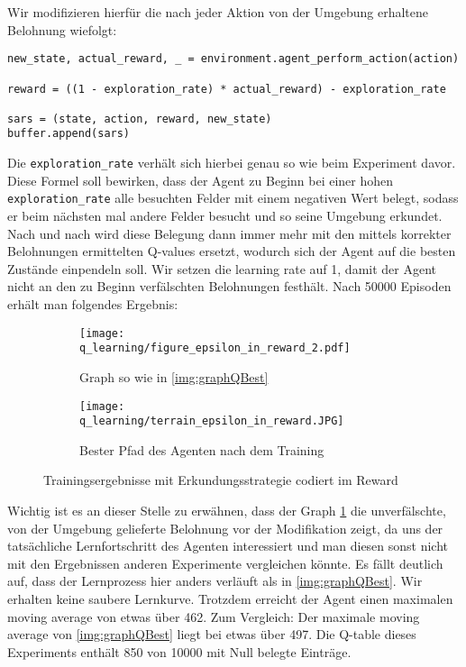 Wir modifizieren hierfür die nach jeder Aktion von der Umgebung erhaltene Belohnung wiefolgt:
\begin{verbatim}
new_state, actual_reward, _ = environment.agent_perform_action(action)

reward = ((1 - exploration_rate) * actual_reward) - exploration_rate

sars = (state, action, reward, new_state)
buffer.append(sars)
\end{verbatim}
Die \texttt{exploration_rate} verhält sich hierbei genau so wie beim Experiment davor. Diese Formel soll bewirken, dass der Agent zu Beginn bei einer hohen \texttt{exploration_rate} alle besuchten Felder mit einem negativen Wert belegt, sodass er beim nächsten mal andere Felder besucht und so seine Umgebung erkundet. Nach und nach wird diese Belegung dann immer mehr mit den mittels korrekter Belohnungen ermittelten Q-values ersetzt, wodurch sich der Agent auf die besten Zustände einpendeln soll. Wir setzen die learning rate auf 1, damit der Agent nicht an den zu Beginn verfälschten Belohnungen festhält. Nach 50000 Episoden erhält man folgendes Ergebnis:
\begin{figure}[H]
    \centering
    \begin{subfigure}[b]{0.49\textwidth}
        \texttt{[image: q\_learning/figure\_epsilon\_in\_reward\_2.pdf]}
        \caption{Graph so wie in \ref{img:graphQBest}}
        \label{img:graphQEpsInRew}
    \end{subfigure}
    \begin{subfigure}[b]{0.49\textwidth}
        \texttt{[image: q\_learning/terrain\_epsilon\_in\_reward.JPG]}
        \caption{Bester Pfad des Agenten nach dem Training}
        \label{img:pathQEpsInRew}
    \end{subfigure}
    \caption{Trainingsergebnisse mit Erkundungsstrategie codiert im Reward}
\end{figure}
Wichtig ist es an dieser Stelle zu erwähnen, dass der Graph \ref{img:graphQEpsInRew} die unverfälschte, von der Umgebung gelieferte Belohnung vor der Modifikation zeigt, da uns der tatsächliche Lernfortschritt des Agenten interessiert und man diesen sonst nicht mit den Ergebnissen anderen Experimente vergleichen könnte. Es fällt deutlich auf, dass der Lernprozess hier anders verläuft als in \ref{img:graphQBest}. Wir erhalten keine saubere Lernkurve. Trotzdem erreicht der Agent einen maximalen moving average von etwas über 462. Zum Vergleich: Der maximale moving average von \ref{img:graphQBest} liegt bei etwas über 497. Die Q-table dieses Experiments enthält 850 von 10000 mit Null belegte Einträge.

